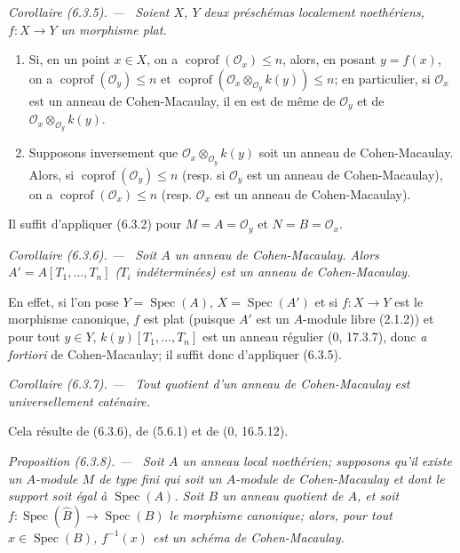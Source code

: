 \documentclass[10pt,oneside]{book}
\newenvironment{proposition}[1][]{%
  \par\medskip\noindent\itshape Proposition (#1). ---\ }{\par}
\newenvironment{corollary}[1][]{%
  \par\medskip\noindent\itshape Corollaire (#1). ---\ }{\par}
\begin{document}
\begin{corollary}[6.3.5]
\label{IV.2.s6.3.5-fr}
Soient $X$, $Y$ deux préschémas localement noethériens, $f:X\to Y$ un
morphisme plat.
\begin{enumerate}
\item[(i)] Si, en un point $x\in X$, on a
$\operatorname{coprof}(\mathcal O_x)\leq n$, alors, en posant $y=f(x)$, on a
$\operatorname{coprof}(\mathcal O_y)\leq n$ et
$\operatorname{coprof}(\mathcal O_x\otimes_{\mathcal O_y}k(y))\leq n$; en
particulier, si $\mathcal O_x$ est un anneau de Cohen-Macaulay, il en est de
même de $\mathcal O_y$ et de
$\mathcal O_x\otimes_{\mathcal O_y}k(y)$.
\item[(ii)] Supposons inversement que
$\mathcal O_x\otimes_{\mathcal O_y}k(y)$ soit un anneau de Cohen-Macaulay.
Alors, si $\operatorname{coprof}(\mathcal O_y)\leq n$ (resp. si
$\mathcal O_y$ est un anneau de Cohen-Macaulay), on a
$\operatorname{coprof}(\mathcal O_x)\leq n$ (resp. $\mathcal O_x$ est un
anneau de Cohen-Macaulay).
\end{enumerate}
\end{corollary}

Il suffit d'appliquer (6.3.2) pour $M=A=\mathcal O_y$ et
$N=B=\mathcal O_x$.

\begin{corollary}[6.3.6]
\label{IV.2.s6.3.6-fr}
Soit $A$ un anneau de Cohen-Macaulay. Alors
$A'=A[T_1,\ldots,T_n]$ ($T_i$ indéterminées) est un anneau de
Cohen-Macaulay.
\end{corollary}

En effet, si l'on pose $Y=\operatorname{Spec}(A)$,
$X=\operatorname{Spec}(A')$ et si $f:X\to Y$ est le morphisme canonique, $f$
est plat (puisque $A'$ est un $A$-module libre (2.1.2)) et pour tout $y\in Y$,
$k(y)[T_1,\ldots,T_n]$ est un anneau régulier (0, 17.3.7), donc \emph{a
fortiori} de Cohen-Macaulay; il suffit donc d'appliquer (6.3.5).

\begin{corollary}[6.3.7]
\label{IV.2.s6.3.7-fr}
Tout quotient d'un anneau de Cohen-Macaulay est universellement caténaire.
\end{corollary}

Cela résulte de (6.3.6), de (5.6.1) et de (0, 16.5.12).

\begin{proposition}[6.3.8]
\label{IV.2.s6.3.8-fr}
Soit $A$ un anneau local noethérien; supposons qu'il existe un $A$-module $M$
de type fini qui soit un $A$-module de Cohen-Macaulay et dont le support soit
égal à $\operatorname{Spec}(A)$. Soit $B$ un anneau quotient de $A$, et soit
$f:\operatorname{Spec}(\widehat B)\to\operatorname{Spec}(B)$ le morphisme
canonique; alors, pour tout $x\in\operatorname{Spec}(B)$, $f^{-1}(x)$ est un
schéma de Cohen-Macaulay.
\end{proposition}
\end{document}
